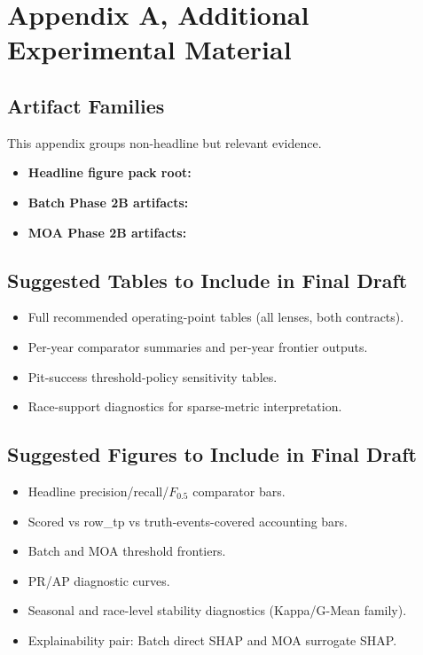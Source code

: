 \chapter{Appendix A, Additional Experimental Material}

\section{Artifact Families}

This appendix groups non-headline but relevant evidence.

\begin{itemize}
    \item \textbf{Headline figure pack root:}
    \item \textbf{Batch Phase 2B artifacts:}
    \item \textbf{MOA Phase 2B artifacts:}
\end{itemize}

\section{Suggested Tables to Include in Final Draft}

\begin{itemize}
    \item Full recommended operating-point tables (all lenses, both contracts).
    \item Per-year comparator summaries and per-year frontier outputs.
    \item Pit-success threshold-policy sensitivity tables.
    \item Race-support diagnostics for sparse-metric interpretation.
\end{itemize}

\section{Suggested Figures to Include in Final Draft}

\begin{itemize}
    \item Headline precision/recall/$F_{0.5}$ comparator bars.
    \item Scored vs row\_tp vs truth-events-covered accounting bars.
    \item Batch and MOA threshold frontiers.
    \item PR/AP diagnostic curves.
    \item Seasonal and race-level stability diagnostics (Kappa/G-Mean family).
    \item Explainability pair: Batch direct SHAP and MOA surrogate SHAP.
\end{itemize}

